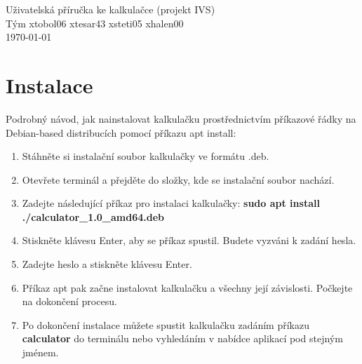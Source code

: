 \documentclass[a4paper, 11pt]{article}
\begin{document}
    \begin{center}
        \LARGE Uživatelská příručka ke kalkulačce (projekt IVS)\\[0.4em]

        \Large Tým xtobol06 xtesar43 xsteti05 xhalen00\\[0.4em]

        \Large \today
    \end{center}

    \tableofcontents
    \newpage

    \section{Instalace}
    Podrobný návod, jak nainstalovat kalkulačku prostřednictvím příkazové řádky na Debian-based distribucích pomocí příkazu apt install:
    \begin{enumerate}
        \item Stáhněte si instalační soubor kalkulačky ve formátu .deb.    
        \item Otevřete terminál a přejděte do složky, kde se instalační soubor nachází.
        \item Zadejte následující příkaz pro instalaci kalkulačky: 
         \textbf{sudo apt install ./calculator\_1.0\_amd64.deb}
        \item Stiskněte klávesu Enter, aby se příkaz spustil. Budete vyzváni k zadání hesla.
        \item Zadejte heslo a stiskněte klávesu Enter.
        \item Příkaz apt pak začne instalovat kalkulačku a všechny její závislosti. Počkejte na dokončení procesu.
        \item Po dokončení instalace můžete spustit kalkulačku zadáním příkazu \textbf{calculator} do terminálu nebo vyhledáním v nabídce aplikací pod stejným jménem.
    \end{enumerate}
\end{document}
